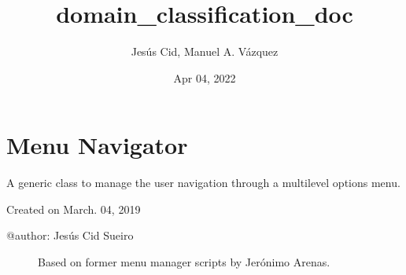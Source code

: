 \documentclass[letterpaper,10pt,english]{sphinxmanual}
\title{domain\_classification\_doc}
\date{Apr 04, 2022}
\author{Jesús Cid, Manuel A.\@{} Vázquez}
\begin{document}
\pagestyle{empty}
\sphinxmaketitle
\pagestyle{plain}
\sphinxtableofcontents
\pagestyle{normal}
\label{\detokenize{index::doc}}



\chapter{Menu Navigator}
\label{\detokenize{mn_menu_navigator:menu-navigator}}\label{\detokenize{mn_menu_navigator::doc}}\label{\detokenize{mn_menu_navigator:module-src.menu_navigator.menu_navigator}}
\sphinxAtStartPar
A generic class to manage the user navigation through a multilevel options
menu.

\sphinxAtStartPar
Created on March. 04, 2019
\begin{description}
\item[{@author: Jesús Cid Sueiro}] \leavevmode
\sphinxAtStartPar
Based on former menu manager scripts by Jerónimo Arenas.

\end{description}
\end{document}
